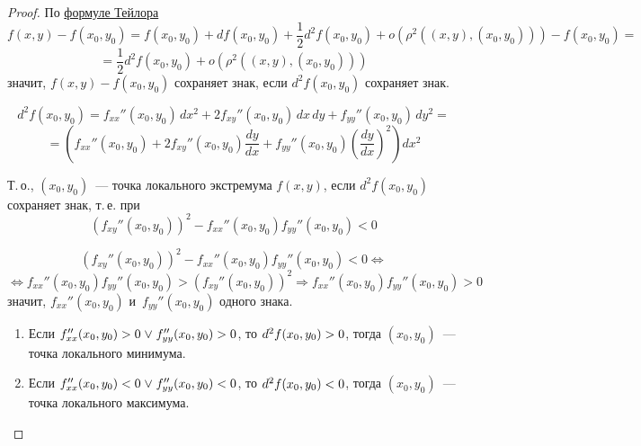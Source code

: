 \begin{proof}
По \hyperref[eq:Taylor_series_for_several_variables]{формуле Тейлора}
\begin{equation*}
f(x, y) - f(x_0, y_0) = f(x_0, y_0) + df(x_0, y_0) + \frac12 d^2f(x_0, y_0) + o(\rho^2((x, y), (x_0, y_0))) - f(x_0, y_0) =
\end{equation*}
\begin{equation*}
= \frac12 d^2f(x_0, y_0) + o(\rho^2((x, y), (x_0, y_0)))
\end{equation*}
значит, $f(x, y) - f(x_0, y_0)$ сохраняет знак, если $d^2f(x_0, y_0)$ сохраняет знак.

\begin{equation*}
d^2f(x_0, y_0) = f_{xx}''(x_0, y_0)\,dx^2 + 2f_{xy}''(x_0, y_0)\,dx\,dy + f_{yy}''(x_0, y_0)\,dy^2 =
\end{equation*}
\begin{equation*}
= \left(f_{xx}''(x_0, y_0) + 2f_{xy}''(x_0, y_0) \frac{dy}{dx} + f_{yy}''(x_0, y_0) \left(\frac{dy}{dx}\right)^2\right) dx^2
\end{equation*}

Т.\,о., $(x_0, y_0)$~--- точка локального экстремума $f(x, y)$,
если $d^2f(x_0, y_0)$ сохраняет знак, т.\,е. при
\begin{equation*}
(f_{xy}''(x_0, y_0))^2 - f_{xx}''(x_0, y_0) f_{yy}''(x_0, y_0) < 0
\end{equation*}

\begin{equation*}
(f_{xy}''(x_0, y_0))^2 - f_{xx}''(x_0, y_0) f_{yy}''(x_0, y_0) < 0 \Leftrightarrow
\end{equation*}
\begin{equation*}
\Leftrightarrow f_{xx}''(x_0, y_0) f_{yy}''(x_0, y_0) > (f_{xy}''(x_0, y_0))^2 \Rightarrow f_{xx}''(x_0, y_0) f_{yy}''(x_0, y_0) > 0
\end{equation*}
значит, $f_{xx}''(x_0, y_0)$ и~$f_{yy}''(x_0, y_0)$ одного знака.

\begin{enumerate}
	\item Если $f_{xx}''(x_0, y_0) > 0 \mathrel{\lor} f_{yy}''(x_0, y_0) > 0$, то $d^2 f(x_0, y_0) \opbr> 0$, тогда $(x_0, y_0)$~--- точка локального минимума.
	\item Если $f_{xx}''(x_0, y_0) < 0 \mathrel{\lor} f_{yy}''(x_0, y_0) < 0$, то $d^2 f(x_0, y_0) \opbr< 0$, тогда $(x_0, y_0)$~--- точка локального максимума.
\end{enumerate}
\end{proof}

